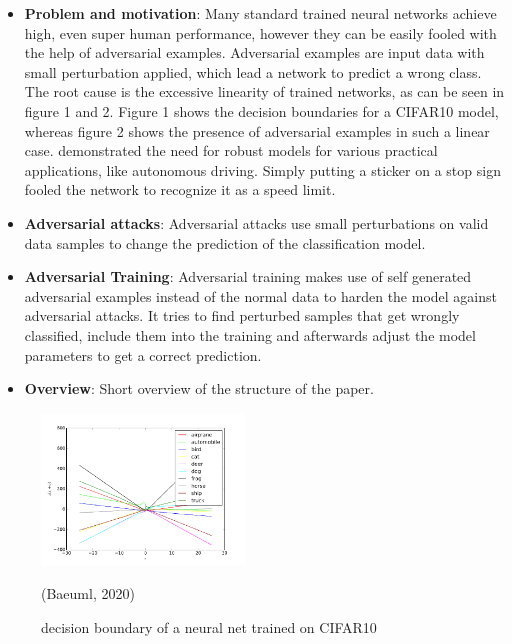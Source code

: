 \documentclass[conference]{IEEEtran}
\begin{document}
\begin{itemize}
  \item \textbf{Problem and motivation}: Many standard trained neural networks achieve high, even super human performance, however they can be easily fooled with the help of adversarial examples. Adversarial examples are input data with small perturbation applied, which lead a network to predict a wrong class. The root cause is the excessive linearity of trained networks, as can be seen in figure 1 and 2. Figure 1 shows the decision boundaries for a CIFAR10 model, whereas figure 2 shows the presence of adversarial examples in such a linear case. \cite{b6} demonstrated the need for robust models for various practical applications, like autonomous driving. Simply putting a sticker on a stop sign fooled the network to recognize it as a speed limit. 
  \item \textbf{Adversarial attacks}: Adversarial attacks use small perturbations on valid data samples to change the prediction of the classification model. 
  \item \textbf{Adversarial Training}: Adversarial training makes use of self generated adversarial examples instead of the normal data to harden the model against adversarial attacks. It tries to find perturbed samples that get wrongly classified, include them into the training and afterwards adjust the model parameters to get a correct prediction. 
  \item \textbf{Overview}: Short overview of the structure of the paper.
\end{itemize}

\begin{figure}[ht]
  \centering
  \vspace{-0.0cm}
  \includegraphics[width=0.48\textwidth]{CIFAR10-decision_boundary.png}
  \label{fig: Decision boundary of a neural network}
  \caption{decision boundary of a neural net trained on CIFAR10} (Baeuml, 2020)
\end{figure}
\end{document}
